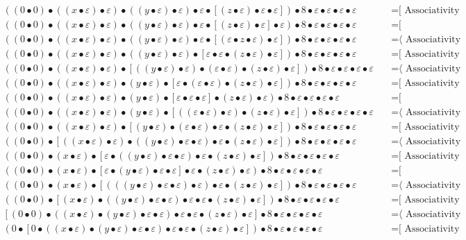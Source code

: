 \documentclass{article}
\begin{document}
\begin{align*}
((0 • 0) • ((x • ε) • ε) • ((y • ε) • ε) • ε • [(z • ε) • ε • ε]) • 8 • ε • ε • ε • ε
  & \quad \text{=[ Associativity ⟩}\\
((0 • 0) • ((x • ε) • ε) • ((y • ε) • ε) • ε • [(z • ε) • ε] • ε) • 8 • ε • ε • ε • ε
  & \quad \text{=[ Commutativity ⟩}\\
((0 • 0) • ((x • ε) • ε) • ((y • ε) • ε) • ε • [(ε • z • ε) • ε]) • 8 • ε • ε • ε • ε
  & \quad \text{=⟨ Associativity ]}\\
((0 • 0) • ((x • ε) • ε) • ((y • ε) • ε) • [ε • ε • (z • ε) • ε]) • 8 • ε • ε • ε • ε
  & \quad \text{=[ Associativity ⟩}\\
((0 • 0) • ((x • ε) • ε) • [((y • ε) • ε) • (ε • ε) • (z • ε) • ε]) • 8 • ε • ε • ε • ε
  & \quad \text{=⟨ Associativity ]}\\
((0 • 0) • ((x • ε) • ε) • (y • ε) • [ε • (ε • ε) • (z • ε) • ε]) • 8 • ε • ε • ε • ε
  & \quad \text{=[ Associativity ⟩}\\
((0 • 0) • ((x • ε) • ε) • (y • ε) • [ε • ε • ε] • (z • ε) • ε) • 8 • ε • ε • ε • ε
  & \quad \text{=[ Commutativity ⟩}\\
((0 • 0) • ((x • ε) • ε) • (y • ε) • [((ε • ε) • ε) • (z • ε) • ε]) • 8 • ε • ε • ε • ε
  & \quad \text{=⟨ Associativity ]}\\
((0 • 0) • ((x • ε) • ε) • [(y • ε) • (ε • ε) • ε • (z • ε) • ε]) • 8 • ε • ε • ε • ε
  & \quad \text{=[ Associativity ⟩}\\
((0 • 0) • [((x • ε) • ε) • ((y • ε) • ε • ε) • ε • (z • ε) • ε]) • 8 • ε • ε • ε • ε
  & \quad \text{=⟨ Associativity ]}\\
((0 • 0) • (x • ε) • [ε • ((y • ε) • ε • ε) • ε • (z • ε) • ε]) • 8 • ε • ε • ε • ε
  & \quad \text{=[ Associativity ⟩}\\
((0 • 0) • (x • ε) • [ε • (y • ε) • ε • ε] • ε • (z • ε) • ε) • 8 • ε • ε • ε • ε
  & \quad \text{=[ Commutativity ⟩}\\
((0 • 0) • (x • ε) • [(((y • ε) • ε • ε) • ε) • ε • (z • ε) • ε]) • 8 • ε • ε • ε • ε
  & \quad \text{=⟨ Associativity ]}\\
((0 • 0) • [(x • ε) • ((y • ε) • ε • ε) • ε • ε • (z • ε) • ε]) • 8 • ε • ε • ε • ε
  & \quad \text{=[ Associativity ⟩}\\
[(0 • 0) • ((x • ε) • (y • ε) • ε • ε) • ε • ε • (z • ε) • ε] • 8 • ε • ε • ε • ε
  & \quad \text{=⟨ Associativity ]}\\
(0 • [0 • ((x • ε) • (y • ε) • ε • ε) • ε • ε • (z • ε) • ε]) • 8 • ε • ε • ε • ε
  & \quad \text{=[ Associativity ⟩}\\

\end{align*}
\end{document}
